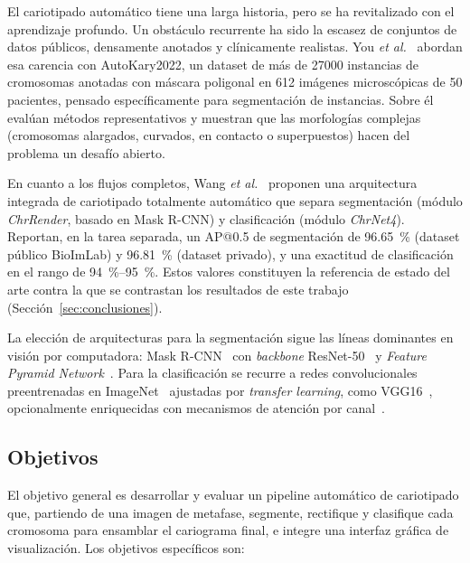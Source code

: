 \documentclass[11pt,a4paper]{article}
\begin{document}
El cariotipado automático tiene una larga historia, pero se ha revitalizado con el
aprendizaje profundo. Un obstáculo recurrente ha sido la escasez de conjuntos de
datos públicos, densamente anotados y clínicamente realistas. You \textit{et
al.}~\cite{you2023autokary} abordan esa carencia con AutoKary2022, un
dataset de más de 27000 instancias de cromosomas anotadas con máscara poligonal en
612 imágenes microscópicas de 50 pacientes, pensado específicamente para
segmentación de instancias. Sobre él evalúan métodos representativos y muestran que
las morfologías complejas (cromosomas alargados, curvados, en contacto o
superpuestos) hacen del problema un desafío abierto.

En cuanto a los flujos completos, Wang \textit{et al.}~\cite{wang2024fully}
proponen una arquitectura integrada de cariotipado totalmente automático que separa
segmentación (módulo \textit{ChrRender}, basado en Mask R-CNN) y clasificación
(módulo \textit{ChrNet4}). Reportan, en la tarea separada, un AP@0.5 de
segmentación de \SI{96.65}{\percent} (dataset público BioImLab) y
\SI{96.81}{\percent} (dataset privado), y una exactitud de clasificación en el rango
de \SI{94}{\percent}--\SI{95}{\percent}. Estos valores constituyen la referencia de
estado del arte contra la que se contrastan los resultados de este trabajo
(Sección~\ref{sec:conclusiones}).

La elección de arquitecturas para la segmentación sigue las líneas dominantes en
visión por computadora: Mask R-CNN~\cite{he2017maskrcnn} con \textit{backbone}
ResNet-50~\cite{he2016resnet} y \textit{Feature Pyramid
Network}~\cite{lin2017fpn}. Para la clasificación se recurre a redes convolucionales
preentrenadas en ImageNet~\cite{deng2009imagenet} ajustadas por \textit{transfer
learning}, como VGG16~\cite{simonyan2015vgg}, opcionalmente enriquecidas con
mecanismos de atención por canal~\cite{hu2018senet}.

\subsection{Objetivos}

El objetivo general es desarrollar y evaluar un pipeline automático de cariotipado
que, partiendo de una imagen de metafase, segmente, rectifique y clasifique cada
cromosoma para ensamblar el cariograma final, e integre una interfaz gráfica de
visualización. Los objetivos específicos son:
\end{document}
